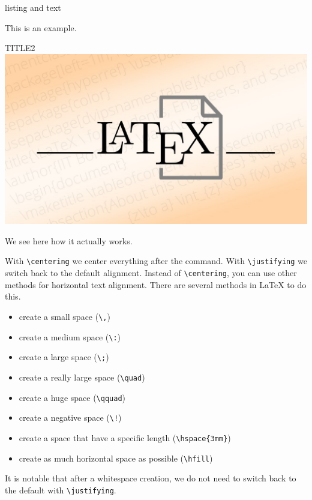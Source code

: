 \documentclass[]{myHOWTO-V001}
\begin{document}
\begin{myTEXEXdoclst}{}{listing and text}
\setlength{\parskip}{3mm}

This is an example.

\centering
\begin{myFIGlst}{TITLE2}{}
	\includegraphics[scale=0.07]{LaTeX.jpg}
\end{myFIGlst}

\justifying
We see here how it actually works.
\end{myTEXEXdoclst}

With \Verb|\centering| we center everything after the command. With \Verb|\justifying| we switch back to the default alignment. Instead of \Verb|\centering|, you can use other methods for horizontal text alignment. There are several methods in \LaTeX{} to do this.

\begin{itemize}
	\item create a small space (\Verb|\,|)
	\item create a medium space (\Verb|\:|)
	\item create a large space (\Verb|\;|)
	\item create a really large space (\Verb|\quad|)
	\item create a huge space (\Verb|\qquad|)
	\item create a negative space (\Verb|\!|)
	\item create a space that have a specific length (\Verb|\hspace{3mm}|)
	\item create as much horizontal space as possible (\Verb|\hfill|)
\end{itemize}

It is notable that after a whitespace creation, we do not need to switch back to the default with \Verb|\justifying|.
\end{document}
